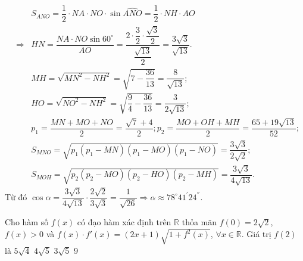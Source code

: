 \begin{ex}
{\begin{eqnarray*}
&& S_{ANO}=\dfrac{1}{2}\cdot NA\cdot NO\cdot \sin \widehat{ANO}=\dfrac{1}{2}\cdot NH\cdot AO\\
&\Rightarrow & HN=\dfrac{NA\cdot NO\sin 60^{\circ}}{AO}=\dfrac{2\cdot \dfrac{3}{2}\cdot \dfrac{\sqrt{3}}{2}}{\dfrac{\sqrt{13}}{2}}=\dfrac{3\sqrt{3}}{\sqrt{13}}.\\
&& MH=\sqrt{MN^2-NH^2}=\sqrt{7-\dfrac{36}{13}}=\dfrac{8}{\sqrt{13}};\\
&& HO=\sqrt{NO^2-NH^2}=\sqrt{\dfrac{9}{4}-\dfrac{36}{13}}=\dfrac{3}{2\sqrt{13}};\\
&& p_1=\dfrac{MN+MO+NO}{2}=\dfrac{\sqrt{7}+4}{2}; p_2=\dfrac{MO+OH+MH}{2}=\dfrac{65+19\sqrt{13}}{52};\\
&& S_{MNO}=\sqrt{p_1\left(p_1-MN\right)\left(p_1-MO\right)\left(p_1-NO\right)}=\dfrac{3\sqrt{3}}{2\sqrt{2}};\\
&& S_{MOH}=\sqrt{p_2\left(p_2-MO\right)\left(p_2-HO\right)\left(p_2-MH\right)}=\dfrac{3\sqrt{3}}{4\sqrt{13}}.
\end{eqnarray*}
Từ đó $\cos \alpha=\dfrac{3\sqrt{3}}{4\sqrt{13}}\cdot \dfrac{2\sqrt{2}}{3\sqrt{3}}=\dfrac{1}{\sqrt{26}}\Rightarrow \alpha\approx 78^{\circ}41^{'}24^{''}$.
	}
\end{ex}
\begin{ex}%
	Cho hàm số $ f(x) $ có đạo hàm xác định trên $ \mathbb{R} $ thỏa mãn $ f(0)=2\sqrt{2} $, $ f(x)>0 $ và $ f(x)\cdot f'(x)=(2x+1)\sqrt{1+f^2(x)} $, $ \forall x\in \mathbb{R} $. Giá trị $ f(2) $ là
	\choice
	{$ 5\sqrt{4} $}
	{\True $ 4\sqrt{5} $}
	{$ 3\sqrt{5} $}
	{$ 9 $}
\end{ex}

